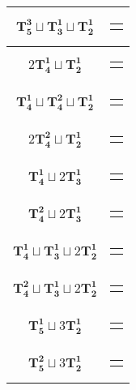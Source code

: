 \documentclass{article}
\begin{document}
{\begin{longtable}{|c|c|}
    $\mathbf{T_{5}^{3}} \sqcup \mathbf{T_{3}^{1}} \sqcup \mathbf{T_{2}^{1}}$ & \begin{tabular}{@{}l@{}} $(6,0,3,4,5)\sqcup(1,8,7)\sqcup(9,11)$ \end{tabular} \\ \hline
    $2\mathbf{T_{4}^{1}} \sqcup \mathbf{T_{2}^{1}}$ & \begin{tabular}{@{}l@{}} $(0,6,1,5)\sqcup(2,9,7,10)\sqcup(3,4)$ \end{tabular} \\ \hline
    $\mathbf{T_{4}^{1}} \sqcup \mathbf{T_{4}^{2}} \sqcup \mathbf{T_{2}^{1}}$ & \begin{tabular}{@{}l@{}} $(11,9,10,7)\sqcup(4,0,5,6)\sqcup(8,1)$ \end{tabular} \\ \hline
    $2\mathbf{T_{4}^{2}} \sqcup \mathbf{T_{2}^{1}}$ & \begin{tabular}{@{}l@{}} $(4,0,5,6)\sqcup(10,9,11,12)\sqcup(8,1)$ \end{tabular} \\ \hline
    $\mathbf{T_{4}^{1}} \sqcup 2\mathbf{T_{3}^{1}}$ & \begin{tabular}{@{}l@{}} $(0,6,1,5)\sqcup(8,10,9)\sqcup(11,4,7)$ \end{tabular} \\ \hline
    $\mathbf{T_{4}^{2}} \sqcup 2\mathbf{T_{3}^{1}}$ & \begin{tabular}{@{}l@{}} $(4,0,5,6)\sqcup(1,8,7)\sqcup(11,9,12)$ \end{tabular} \\ \hline
    $\mathbf{T_{4}^{1}} \sqcup \mathbf{T_{3}^{1}} \sqcup 2\mathbf{T_{2}^{1}}$ & \begin{tabular}{@{}l@{}} $(0,6,1,5)\sqcup(8,10,7)\sqcup(11,4)\sqcup(2,3)$ \end{tabular} \\ \hline
    $\mathbf{T_{4}^{2}} \sqcup \mathbf{T_{3}^{1}} \sqcup 2\mathbf{T_{2}^{1}}$ & \begin{tabular}{@{}l@{}} $(4,0,5,6)\sqcup(11,9,12)\sqcup(2,3)\sqcup(8,1)$ \end{tabular} \\ \hline
    $\mathbf{T_{5}^{1}} \sqcup 3\mathbf{T_{2}^{1}}$ & \begin{tabular}{@{}l@{}} $(0,6,1,5,2)\sqcup(10,3)\sqcup(9,7)\sqcup(11,12)$ \end{tabular} \\ \hline
    $\mathbf{T_{5}^{2}} \sqcup 3\mathbf{T_{2}^{1}}$ & \begin{tabular}{@{}l@{}} $(6,1,8,4,7)\sqcup(3,5)\sqcup(9,12)\sqcup(10,11)$ \end{tabular} \\ \hline

\end{longtable}}
\end{document}
